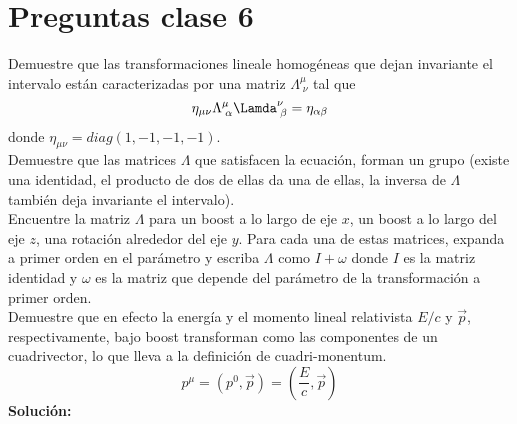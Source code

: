 \documentclass[../main_ej.tex]{subfiles}
\begin{document}
\section{Preguntas clase 6}
Demuestre que las transformaciones lineale homogéneas que dejan invariante el intervalo están caracterizadas por una matriz $\Lambda^\mu_{\;\nu}$ tal que
\begin{equation}
  \eta_{\mu\nu}\Lambda^\mu_{\;\alpha}\Lamda^{\nu}_{\;\beta} = \eta_{\alpha \beta}
\end{equation}
 donde $\eta_{\mu\nu}=diag(1,-1,-1,-1)$. \\
 Demuestre que las matrices $\Lambda$ que satisfacen la ecuación, forman un grupo (existe una identidad, el producto de dos de ellas da una de ellas, la inversa de $\Lambda$ también deja invariante el intervalo).\\
 Encuentre la matriz $\Lambda$ para un boost a lo largo de eje $x$, un boost a lo largo del eje $z$, una rotación alrededor del eje $y$. Para cada una de estas matrices, expanda a primer orden en el parámetro y escriba $\Lambda$ como $I+\omega$ donde $I$ es la matriz identidad y $\omega$ es la matriz que depende del parámetro de la transformación a primer orden. \\
 Demuestre que en efecto la energía y el momento lineal relativista $E/c$ y $\vec{p}$, respectivamente, bajo boost transforman como las componentes de un cuadrivector, lo que lleva a la definición de cuadri-monentum.
 \begin{equation}
   p^\mu=(p^0,\vec{p}) = \left(\frac{E}{c} , \vec{p} \right)
  \end{equation}
\textbf{Solución:}
\end{document}
